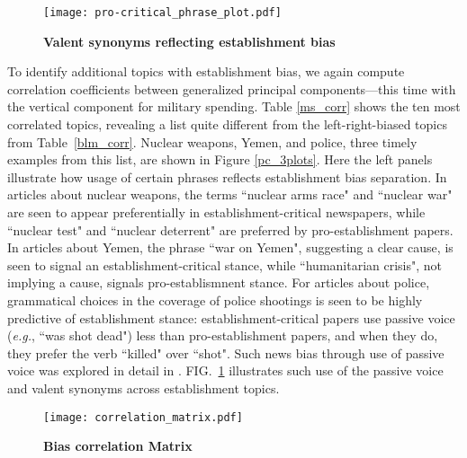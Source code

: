 \documentclass[10pt,letterpaper]{article}
\def\eg{{\frenchspacing\it e.g.}}
\def\Fig#1{FIG.~\ref{#1}}
\def\Tabl#1{Table~\ref{#1}}
\begin{document}
\clearpage

\begin{figure}[tb]
\caption{{\bf Valent synonyms reflecting establishment bias}
}
\texttt{[image: pro-critical\_phrase\_plot.pdf]}
\vskip-2mm
\label{pro_crit-phrases}
\end{figure}

To identify additional topics with establishment bias, we again compute 
correlation coefficients between generalized principal 
components---this time with the vertical component for
military spending. 
Table \ref{ms_corr} shows the ten most correlated topics,
revealing a list quite different from the 
left-right-biased topics from \Tabl{blm_corr}. 
Nuclear weapons, 
Yemen, and police, three timely examples from this list, are shown in Figure 
\ref{pc_3plots}. 
Here the left panels illustrate how usage of certain phrases reflects 
establishment bias separation. In articles about nuclear weapons,
the terms ``nuclear arms race" and ``nuclear war" are seen to appear 
preferentially in establishment-critical newspapers, while ``nuclear test" and 
``nuclear deterrent" are preferred by pro-establishment papers.
In articles about Yemen, the phrase ``war on Yemen", suggesting a clear cause, 
is seen to signal an establishment-critical stance, while
``humanitarian crisis", not implying a cause, signals pro-establismnent stance.
For articles about police, grammatical choices in the coverage of police 
shootings is seen to be highly predictive of establishment stance:
establishment-critical papers use passive voice (\eg, ``was shot dead") less 
than pro-establishment papers, and when they do, they prefer the verb ``killed" 
over ``shot". Such news bias through use of passive voice was explored in detail in \cite{herman2010manufacturing}.
\Fig{pro_crit-phrases} illustrates such use of the passive voice 
and valent synonyms across establishment topics. 




\clearpage

\begin{figure}[t]
	\caption{{\bf Bias correlation Matrix}
	}
	\hglue-1.4cm 
	\texttt{[image: correlation\_matrix.pdf]}
	\vskip-2mm
	\label{corr_matrix}
\end{figure}
\end{document}
